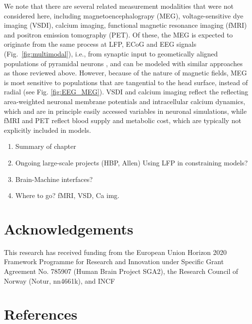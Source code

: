 \documentclass[preprint,11pt,authoryear]{elsarticle}
\newcommand{\hlR}[2][red]{ {\sethlcolor{#1} \hl{#2}} }
\newcommand{\gen}[1]{\color{white}{\hlR{GTE: #1 }}\color{black}}
\newcommand{\gex}[1]{{\color{red}#1}}
\begin{document}
We note that there are several related measurement modalities that were not considered here, including magnetoencephalograpy (MEG), voltage-sensitive dye imaging (VSDI), calcium imaging, functional magnetic resonance imaging (fMRI) and positron emission tomography (PET). Of these, the MEG is expected to originate from the same process at LFP, ECoG and EEG signals (Fig.~\ref{fig:multimodal}), i.e., from synaptic input to geometically aligned populations of pyramidal neurons \citep{Hamalainen1993}, and can be modeled with similar approaches as those reviewed above. However, because of the nature of magnetic fields, MEG is most sensitive to populations that are tangential to the head surface, instead of radial (see Fig. \ref{fig:EEG_MEG}). VSDI and calcium imaging reflect the reflecting area-weighted neuronal membrane potentials and intracellular calcium dynamics, which and are in principle easily accessed variables in neuronal simulations, while fMRI and PET reflect blood supply and metabolic cost, which are typically not explicitly included in models. 
 
\begin{enumerate}
 \item Summary of chapter
 \item Ongoing large-scale projects (HBP, Allen)
 \subitem Using LFP in constraining models?
 \item Brain-Machine interfaces?
 \item Where to go?
 \subitem fMRI, VSD, Ca img.
\end{enumerate}



\section*{Acknowledgements}
\label{sec:acknowledgements}
This research has received funding from the European Union Horizon 2020 Framework Programme for Research
and Innovation under Specific Grant Agreement No. 785907 (Human Brain Project SGA2), the Research Council of Norway (Notur, nn4661k), and \gex{INCF} \gen{Fill in project info.}




\section*{References}
\label{sec:bibliography}


\end{document}
